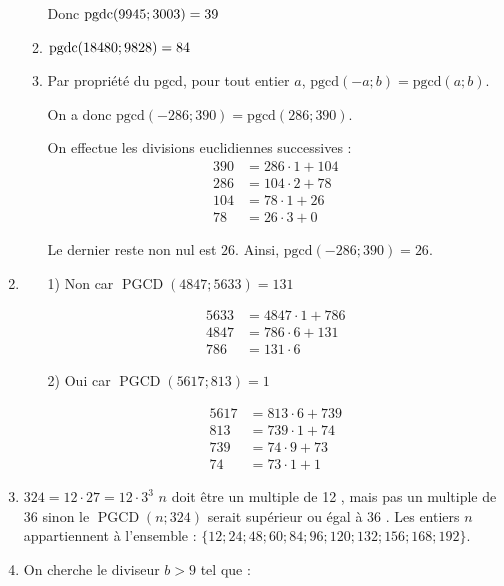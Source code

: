 \begin{enumerate}[label=\thechapter.\arabic*, font=\bfseries, itemsep=7mm,labelsep*=3mm,left=0mm]
\begin{enumerate}[label=\alph*),itemsep=4mm]
\smallskip
Donc $\pgdc(9945;3003)=39$
\item 
$\pgdc(18480;9828)=84$
\item Par propriété du $\text{pgcd}$, pour tout entier $a$, $\text{pgcd}(-a; b) = \text{pgcd}(a; b)$.  

On a donc $\text{pgcd}(-286; 390) = \text{pgcd}(286; 390)$.

On effectue les divisions euclidiennes successives :
\begin{align*}
	390 &= 286 \cdot 1 + 104 \\
	286 &= 104 \cdot 2 + 78 \\
	104 &= 78 \cdot 1 + 26 \\
	78 &= 26 \cdot 3 + 0
\end{align*}

Le dernier reste non nul est $26$.  
Ainsi, $\text{pgcd}(-286; 390) = 26$.
\end{enumerate}


\item
\begin{itemize}\item[1)] Non car $\operatorname{PGCD}(4847 ; 5633)=131$
	
	$$
	\begin{aligned}
		5633 & =4847 \cdot 1+786 \\
		4847 & =786 \cdot 6+131 \\
		786 & =131 \cdot 6
	\end{aligned}
	$$
	
	\item[2)] Oui car $\operatorname{PGCD}(5617 ; 813)=1$
	
	$$
	\begin{aligned}
		5617 & =813 \cdot 6+739 \\
		813 & =739 \cdot 1+74 \\
		739 & =74 \cdot 9+73 \\
		74 & =73 \cdot 1+1
	\end{aligned}
	$$
\end{itemize}


\item $324=12 \cdot 27=12 \cdot 3^3$
$n$ doit être un multiple de 12 , mais pas un multiple de 36 sinon le $\operatorname{PGCD}(n ; 324)$ serait supérieur ou égal à 36 . Les entiers $n$ appartiennent à l'ensemble :
$\{12 ; 24 ; 48 ; 60 ; 84 ; 96 ; 120 ; 132 ; 156 ; 168 ; 192\}$.


\item On cherche le diviseur $b>9$ tel que :


\end{enumerate}
